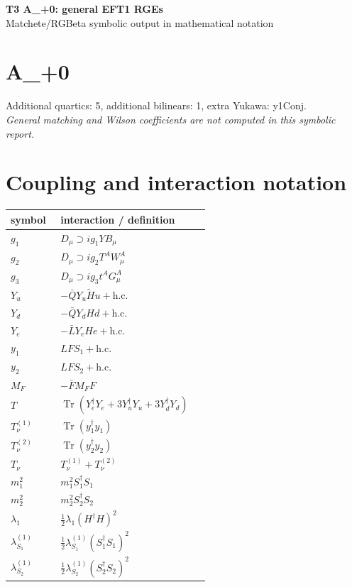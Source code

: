\documentclass[10pt,a4paper]{article}
\begin{document}
\begin{center}
{\Large\bfseries T3 A\_+0: general EFT1 RGEs}\\[4pt]
Matchete/RGBeta symbolic output in mathematical notation
\end{center}
\bigskip
\section*{A\_+0}
Additional quartics: 5, additional bilinears: 1, extra Yukawa: y1Conj.\\
\emph{General matching and Wilson coefficients are not computed in this symbolic report.}
\section*{Coupling and interaction notation}
\begin{longtable}{@{}p{0.23\linewidth}p{0.69\linewidth}@{}}
\toprule
symbol & interaction / definition \\
\midrule
$g_1$ & $D_\mu\supset i g_1YB_\mu$ \\
$g_2$ & $D_\mu\supset i g_2T^AW_\mu^A$ \\
$g_3$ & $D_\mu\supset i g_3t^AG_\mu^A$ \\
$Y_u$ & $-\bar QY_u\widetilde Hu+\mathrm{h.c.}$ \\
$Y_d$ & $-\bar QY_dHd+\mathrm{h.c.}$ \\
$Y_e$ & $-\bar LY_eHe+\mathrm{h.c.}$ \\
$y_1$ & $LFS_1+\mathrm{h.c.}$ \\
$y_2$ & $LFS_2+\mathrm{h.c.}$ \\
$M_F$ & $-\bar FM_FF$ \\
$T$ & $\operatorname{Tr}(Y_e^\dagger Y_e+3Y_u^\dagger Y_u+3Y_d^\dagger Y_d)$ \\
$T_\nu^{(1)}$ & $\operatorname{Tr}(y_1^\dagger y_1)$ \\
$T_\nu^{(2)}$ & $\operatorname{Tr}(y_2^\dagger y_2)$ \\
$T_\nu$ & $T_\nu^{(1)}+T_\nu^{(2)}$ \\
$m_1^2$ & $m_1^2S_1^\dagger S_1$ \\
$m_2^2$ & $m_2^2S_2^\dagger S_2$ \\
$\lambda_1$ & $\frac12\lambda_1(H^\dagger H)^2$ \\
$\lambda_{S_1}^{(1)}$ & $\frac12\lambda_{S_1}^{(1)}(S_1^\dagger S_1)^2$ \\
$\lambda_{S_2}^{(1)}$ & $\frac12\lambda_{S_2}^{(1)}(S_2^\dagger S_2)^2$ \\

\end{longtable}
\end{document}
